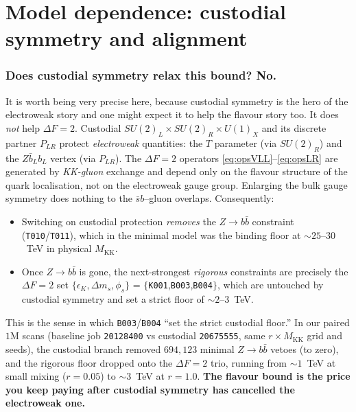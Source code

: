 \documentclass[11pt]{article}
\newcommand{\MKK}{M_{\mathrm{KK}}}
\newcommand{\SUL}{SU(2)_L}
\newcommand{\SUR}{SU(2)_R}
\newcommand{\UX}{U(1)_X}
\newcommand{\PLR}{P_{LR}}
\newcommand{\code}[1]{\texttt{#1}}
\newcommand{\dms}{\Delta m_s}
\newcommand{\phis}{\phi_s}
\theoremstyle{definition}
\begin{document}
\part{Model dependence: custodial symmetry and alignment}
\label{part:cust}

\section{Does custodial symmetry relax this bound? No.}
\label{sec:custodial}

It is worth being very precise here, because custodial symmetry is the hero of
the electroweak story and one might expect it to help the flavour story too. It
does \emph{not} help $\Delta F=2$. Custodial $\SUL\times\SUR\times\UX$ and its
discrete partner $\PLR$ protect \emph{electroweak} quantities: the $T$ parameter
(via $\SUR$) and the $Z\bar b_L b_L$ vertex (via $\PLR$). The $\Delta F=2$
operators \eqref{eq:opsVLL}--\eqref{eq:opsLR} are generated by \emph{KK-gluon}
exchange and depend only on the flavour structure of the quark localisation, not
on the electroweak gauge group. Enlarging the bulk gauge symmetry does nothing to
the $\bar s b$--gluon overlaps. Consequently:
\begin{itemize}[leftmargin=1.4em]
\item Switching on custodial protection \emph{removes} the $Z\to b\bar b$
constraint (\code{T010}/\code{T011}), which in the minimal model was the binding
floor at $\sim 25$--$30$~TeV in physical $\MKK$.
\item Once $Z\to b\bar b$ is gone, the next-strongest \emph{rigorous} constraints
are precisely the $\Delta F=2$ set $\{\epsilon_K,\dms,\phis\}$ =
$\{$\code{K001},\code{B003},\code{B004}$\}$, which are untouched by custodial
symmetry and set a strict floor of $\sim 2$--$3$~TeV.
\end{itemize}
This is the sense in which \code{B003}/\code{B004} ``set the strict custodial
floor.'' In our paired $1$M scans (baseline job \code{20128400} vs custodial
\code{20675555}, same $r\times\MKK$ grid and seeds), the custodial branch removed
$694{,}123$ minimal $Z\to b\bar b$ vetoes (to zero), and the rigorous floor
dropped onto the $\Delta F=2$ trio, running from $\sim 1$~TeV at small mixing
($r=0.05$) to $\sim 3$~TeV at $r=1.0$. \textbf{The flavour bound is the price you
keep paying after custodial symmetry has cancelled the electroweak one.}
\end{document}
